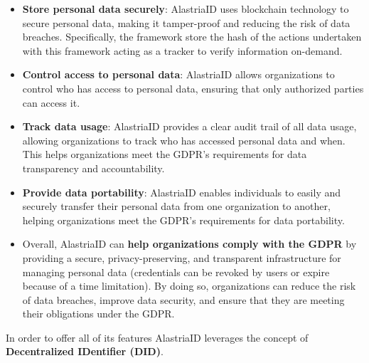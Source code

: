 \documentclass[target=mst,aauheader=]{thud}
\begin{document}
\begin{itemize}

    \item \textbf{Store personal data securely}: AlastriaID uses blockchain technology to secure personal data, making it tamper-proof and reducing the risk of data breaches. Specifically, the framework store the hash of the actions undertaken with this framework acting as a tracker to verify information on-demand.
    \item \textbf{Control access to personal data}: AlastriaID allows organizations to control who has access to personal data, ensuring that only authorized parties can access it.
    \item \textbf{Track data usage}: AlastriaID provides a clear audit trail of all data usage, allowing organizations to track who has accessed personal data and when. This helps organizations meet the GDPR's requirements for data transparency and accountability.
    \item \textbf{Provide data portability}: AlastriaID enables individuals to easily and securely transfer their personal data from one organization to another, helping organizations meet the GDPR's requirements for data portability.
    \item Overall, AlastriaID can \textbf{help organizations comply with the GDPR} by providing a secure, privacy-preserving, and transparent infrastructure for managing personal data (credentials can be revoked by users or expire because of a time limitation). By doing so, organizations can reduce the risk of data breaches, improve data security, and ensure that they are meeting their obligations under the GDPR.

\end{itemize}

In order to offer all of its features AlastriaID leverages the concept of \textbf{Decentralized IDentifier (DID\cite{DID})}.
\end{document}

